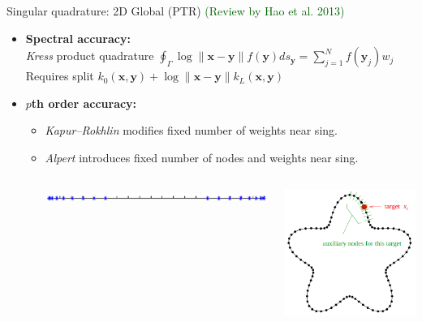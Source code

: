 \documentclass[t]{beamer}
\newcommand{\mbf}[1]{{\bm #1}}           %
\newcommand{\who}[1]{{\scriptsize \textcolor{darkgreen}{(#1)}}}  %
\newcommand{\vg}{\vspace{2ex}}
\newcommand{\xx}{\mbf{x}}
\newcommand{\yy}{\mbf{y}}
\begin{document}
\begin{frame}{Singular quadrature: 2D Global (PTR)}
  \hfill
  \who{Review by Hao et al. 2013}
\begin{itemize}
\item \textbf{Spectral accuracy:} \\
  \emph{Kress} product quadrature
  $\oint_\Gamma \log\|\xx-\yy\| f(\yy) ds_\yy = \sum_{j=1}^N f(\yy_j) w_j$ \\
  Requires split $k_0(\xx, \yy) + \log\|\xx-\yy\| k_L(\xx, \yy) $
  \vg
  \pause
\item \textbf{$p$th order accuracy:}
  \begin{itemize}
  \item \emph{Kapur–Rokhlin} modifies fixed number of weights near sing.
  \item \emph{Alpert} introduces fixed number of nodes and weights near sing.
    \begin{columns}[c]
      \begin{column}{0.6\textwidth}
        \includegraphics[width=\textwidth]{fig/alpert}
      \end{column}
      \begin{column}{0.3\textwidth}
        \includegraphics[width=\textwidth]{fig/alpert_starfish}
      \end{column}
    \end{columns}
  \end{itemize}
\end{itemize}
\end{frame}
\end{document}
